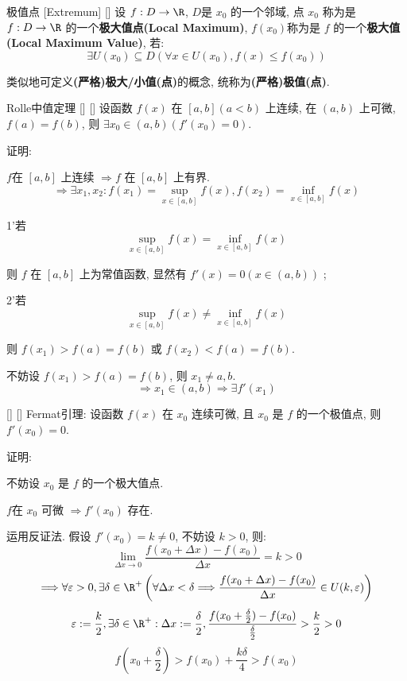 \documentclass[UTF8]{ctexart}
\begin{document}
			\begin{dfn}
			    []
			    {极值点}
			    [Extremum]
			    []
				设 \(f:D\to\R\), \(D\)是 \(x_0\) 的一个邻域, 点 \(x_0\) 称为是 \(f:D\to\R\) 的一个\textbf{极大值点(Local Maximum)}, \(f(x_0)\)称为是 \(f\) 的一个\textbf{极大值(Local Maximum Value)}, 若: 
				\[\exists U(x_0)\subseteq D(\forall x\in U(x_0), f(x)\leq f(x_0))\]
				
				类似地可定义\textbf{(严格)极大/小值(点)}的概念, 统称为\textbf{(严格)极值(点)}. 
			\end{dfn}
			
			\begin{thm}
			    []
			    {Rolle中值定理}
			    []
			    []
				设函数 \(f(x)\) 在 \([a,b](a<b)\) 上连续, 在 \((a,b)\) 上可微, \(f(a)=f(b)\), 则 \(\exists x_0\in (a,b)(f'(x_0)=0)\). 
			\end{thm}
			
			证明: 
			
				\(f\)在 \([a,b]\) 上连续 \(\Longrightarrow f\) 在 \([a,b]\) 上有界. 
				\[\Longrightarrow\exists x_1,x_2: f(x_1)=\sup_{x\in[a,b]}f(x), f(x_2)=\inf_{x\in[a,b]}f(x)\]
				
				1'若\[\sup_{x\in[a,b]}f(x)=\inf_{x\in[a,b]}f(x)\]
				
				则 \(f\) 在 \([a,b]\) 上为常值函数, 显然有 \(f'(x)=0(x\in(a,b))\) ; 
				
				2'若\[\sup_{x\in[a,b]}f(x)\neq\inf_{x\in[a,b]}f(x)\]
				
				则 \(f(x_1)>f(a)=f(b)\) 或 \(f(x_2)<f(a)=f(b)\). 
				
				不妨设 \(f(x_1)>f(a)=f(b)\), 则 \(x_1\neq a,b\). 
				\[\Longrightarrow x_1\in (a,b)\Longrightarrow \exists f'(x_1)\]
				
			\begin{lma}
			    []
			    {}
			    []
			    []
					Fermat引理: 设函数 \(f(x)\) 在 \(x_0\) 连续可微, 且 \(x_0\) 是 \(f\) 的一个极值点, 则 \(f'(x_0)=0\). 
			\end{lma}
				
				证明:
					
					不妨设 \(x_0\) 是 \(f\) 的一个极大值点. 
					
					\(f\)在 \(x_0\) 可微 \(\Longrightarrow f'(x_0)\) 存在. 
					
					运用反证法. 假设 \(f'(x_0)=k\neq 0\), 不妨设 \(k>0\), 则: 
					\[\lim_{\Delta x\to 0}\frac{f(x_0+\Delta x)-f(x_0)}{\Delta x}=k>0\]
					\[\Longrightarrow\forall\varepsilon>0,\exists\delta\in\R^+\left(\forall\Delta x<\delta\Longrightarrow\frac{f(x_0+\Delta x)-f(x_0)}{\Delta x}\in U(k,\varepsilon)\right)\]
					\[\varepsilon:=\frac{k}{2}, \exists \delta\in\R^+: \Delta x:=\frac{\delta}{2}, \frac{f(x_0+\frac{\delta}{2})-f(x_0)}{\frac{\delta}{2}}>\frac{k}{2}>0\]
					\[f(x_0+\frac{\delta}{2})>f(x_0)+\frac{k\delta}{4}>f(x_0)\]
					
\end{document}
